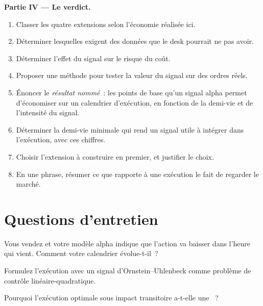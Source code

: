 \begin{problem}
\medskip\noindent\textbf{Partie IV --- Le verdict.}
\begin{enumerate}[resume]
\item Classer les quatre extensions selon l'économie réalisée ici.
\item Déterminer lesquelles exigent des données que le desk pourrait ne pas avoir.
\item Déterminer l'effet du signal sur le risque du coût.
\item Proposer une méthode pour tester la valeur du signal sur des ordres réels.
\item Énoncer le \emph{résultat nommé}~: les points de base qu'un signal alpha permet d'économiser sur un calendrier d'exécution, en fonction de la demi-vie et de l'intensité du signal.
\item Déterminer la demi-vie minimale qui rend un signal utile à intégrer dans l'exécution, avec ces chiffres.
\item Choisir l'extension à construire en premier, et justifier le choix.
\item En une phrase, résumer ce que rapporte à une exécution le fait de regarder le marché.
\end{enumerate}
\end{problem}

\section{Questions d'entretien}

\begin{interviewq}\label{iq:mx:beyond-almgren-chriss:1}
Vous vendez et votre modèle alpha indique que l'action va baisser dans l'heure qui vient. Comment votre calendrier évolue-t-il~?
\end{interviewq}

\begin{interviewq}\label{iq:mx:beyond-almgren-chriss:2}
Formulez l'exécution avec un signal d'Ornstein--Uhlenbeck comme problème de contrôle linéaire-quadratique.
\end{interviewq}

\begin{interviewq}\label{iq:mx:beyond-almgren-chriss:3}
Pourquoi l'exécution optimale sous impact transitoire a-t-elle une ~?
\end{interviewq}

